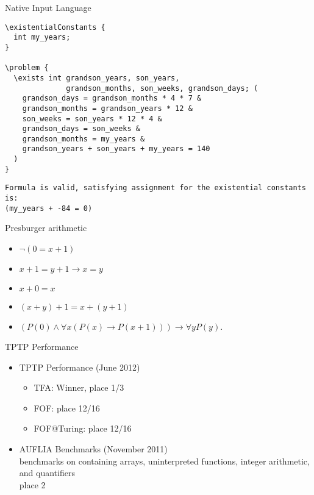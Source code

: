 \documentclass{beamer} %
\newenvironment{page}[1]
	{\begin{frame}[containsverbatim]{#1}}
    	{\end{frame}}
\begin{document}
\begin{page}{Native Input Language}

\begin{lstlisting}
\existentialConstants {
  int my_years;
}

\problem {
  \exists int grandson_years, son_years,
              grandson_months, son_weeks, grandson_days; (
    grandson_days = grandson_months * 4 * 7 &
    grandson_months = grandson_years * 12 &
    son_weeks = son_years * 12 * 4 &
    grandson_days = son_weeks &
    grandson_months = my_years &
    grandson_years + son_years + my_years = 140
  )
}
\end{lstlisting}
\begin{lstlisting}
Formula is valid, satisfying assignment for the existential constants is:
(my_years + -84 = 0)
\end{lstlisting}

\end{page}
\begin{page}{Presburger arithmetic}

\begin{itemize}
\item $\lnot(0 = x + 1)$
\item $x + 1 = y + 1 \to x = y$
\item $x + 0 = x$
\item $(x + y) + 1 = x + (y + 1)$
\item $(P(0) \land \forall x(P(x) \to P(x + 1))) \to \forall y P(y).$
\end{itemize}

\end{page}
\begin{page}{TPTP Performance}

\begin{itemize}
	\item TPTP Performance (June 2012)
	\begin{itemize}
		\item TFA: Winner, place 1/3
		\item FOF: place 12/16
		\item FOF@Turing: place 12/16
	\end{itemize}
	\item AUFLIA Benchmarks (November 2011) \\
		benchmarks on containing arrays, uninterpreted functions, integer arithmetic, and quantifiers \\
		place 2
\end{itemize}

\end{page}
\end{document}
